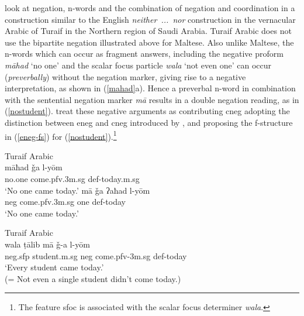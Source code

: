 \documentclass[output=paper,hidelinks]{langscibook}
\begin{document}
\citet{AlruwailiSadler:2018} look at negation, n-words and the combination of negation and coordination in a construction similar to the English {\em neither~...~nor} construction  in the vernacular Arabic of Turaif in the Northern region of Saudi Arabia. Turaif Arabic does not use the bipartite negation illustrated above for Maltese.  Also unlike  Maltese, the n-words which can occur as fragment answers, including the negative proform {\em m\={a}had} `no one' and the scalar focus particle {\em wala} `not even one' can occur ({\em preverbally}) without the negation marker, giving rise to a negative interpretation, as shown in (\ref{mahad}a).  Hence a preverbal n-word in combination with
the sentential negation marker {\em m\={a}} results in a double negation reading, as in (\ref{nostudent}). \citet{AlruwailiSadler:2018} treat these negative arguments as contributing {\sc cneg} adopting the distinction between {\sc eneg} and {\sc cneg} introduced by  \citet{przepiorkowski2015two}, and proposing the f-structure in (\ref{eneg-fs}) for (\ref{nostudent}).\footnote{The feature {\sc sfoc} is associated with the scalar focus determiner {\em wala}.}





\ea \label{mahad} Turaif Arabic \citep[30]{AlruwailiSadler:2018}\\
\ea
\gll
m\={a}ħad   \v{g}a l-y\={o}m\\
no.one come.{\sc pfv.3m.sg} {\sc def}-today.{\sc m.sg}\\
\glt `No one came today.'
\ex
\gll
m\={a} \v{g}a {ʔ}aħad l-y\={o}m\\
{\sc neg} come.{\sc pfv.3m.sg} one {\sc def}-today\\
\glt `No one  came today.'
\z\z



\ea\label{nostudent}  Turaif Arabic \citep[30]{AlruwailiSadler:2018}\\
\gll
 wala ṭ\={a}lib m\={a} \v{g}-a  l-y\={o}m\\
{\sc neg.sfp} student.{\sc m.sg} {\sc neg} come.{\sc pfv-3m.sg}  {\sc def}-today\\
\glt `Every student came today.'  \\
 (= Not even a single student didn't come today.)
\z
\end{document}
